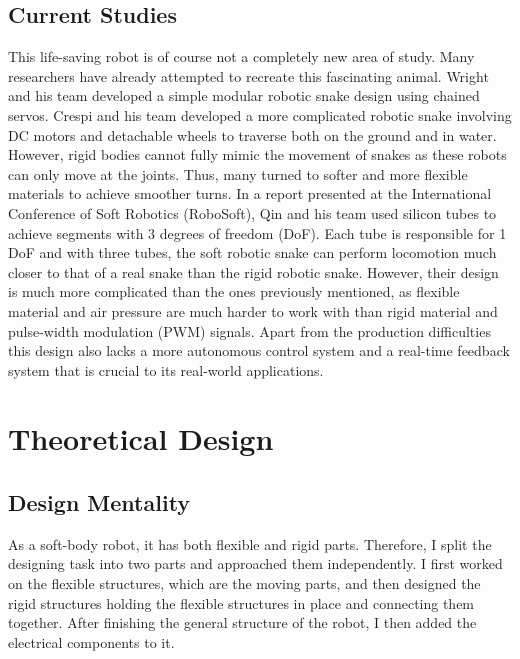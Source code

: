 \documentclass[twoside]{article}
\begin{document}
\subsection{Current Studies}
This life-saving robot is of course not a completely new area of study. Many researchers have already attempted to recreate this fascinating animal. Wright and his team developed a simple modular robotic snake design using chained servos. Crespi and his team developed a more complicated robotic snake involving DC motors and detachable wheels to traverse both on the ground and in water. However, rigid bodies cannot fully mimic the movement of snakes as these robots can only move at the joints. Thus, many turned to softer and more flexible materials to achieve smoother turns. In a report presented at the International Conference of Soft Robotics (RoboSoft), Qin and his team used silicon tubes to achieve segments with 3 degrees of freedom (DoF). Each tube is responsible for 1 DoF and with three tubes, the soft robotic snake can perform locomotion much closer to that of a real snake than the rigid robotic snake. However, their design is much more complicated than the ones previously mentioned, as flexible material and air pressure are much harder to work with than rigid material and pulse-width modulation (PWM) signals. Apart from the production difficulties this design also lacks a more autonomous control system and a real-time feedback system that is crucial to its real-world applications. 


\section{Theoretical Design}
\subsection{Design Mentality}
As a soft-body robot, it has both flexible and rigid parts. Therefore, I split the designing task into two parts and approached them independently. I first worked on the flexible structures, which are the moving parts, and then designed the rigid structures holding the flexible structures in place and connecting them together. After finishing the general structure of the robot, I then added the electrical components to it.
\end{document}
